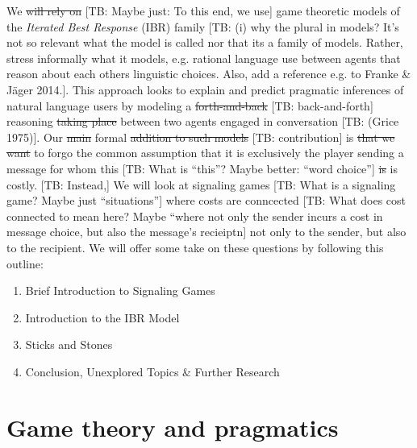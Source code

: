 \documentclass[10pt]{article}
\newcommand{\tb}[1]{\textcolor[rgb]{.8,.33,.0}{[TB: #1]}}%
\begin{document}
We \sout{will rely on} \tb{Maybe just: To this end, we use} game theoretic models of the \textit{Iterated Best Response} (IBR) family \tb{(i) why the plural in models? It's not so relevant what the model is called nor that its a family of models. Rather, stress informally what it models, e.g. rational language use between agents that reason about each others linguistic choices. Also, add a reference e.g. to Franke \& J\"ager 2014.}. This approach looks to explain and predict pragmatic inferences of natural language users by modeling a \sout{forth-and-back} \tb{back-and-forth} reasoning \sout{taking place} between two agents engaged in conversation \tb{(Grice 1975)}.
Our \sout{main} formal \sout{addition to such models} \tb{contribution} is \sout{that we want} to forgo the common assumption that it is exclusively the player sending a message for whom this \tb{What is ``this''? Maybe better: ``word choice''} \sout{is} is costly. \tb{Instead,} We will look at signaling games \tb{What is a signaling game? Maybe just ``situations''} where costs are conncected \tb{What does cost connected to mean here? Maybe ``where not only the sender incurs a cost in message choice, but also the message's recieiptn} not only to the sender, but also to the recipient.
We will offer some take on these questions by following this outline:
\begin{enumerate} %
\item Brief Introduction to Signaling Games
\item Introduction to the IBR Model
\item Sticks and Stones
\item Conclusion, Unexplored Topics \& Further Research
\end{enumerate}

\section{Game theory and pragmatics}
\end{document}
